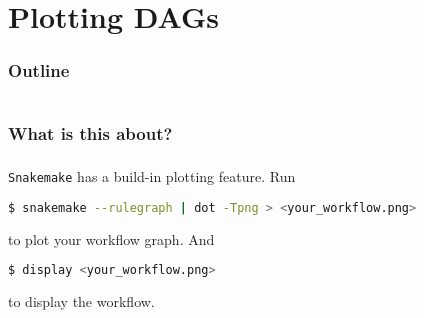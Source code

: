 \section{Plotting DAGs}

\begin{frame}
    \frametitle{Outline}
    \begin{columns}[t]
        \begin{column}{.5\textwidth}
            \tableofcontents[sections={1-9},currentsection]
        \end{column}
        \begin{column}{.5\textwidth}
            \tableofcontents[sections={10-18},currentsection]
        \end{column}
    \end{columns}
\end{frame}

\begin{frame}
  \frametitle{What is this about?}
\end{frame}


\begin{frame}[fragile]
  \frametitle{}
  \texttt{Snakemake} has a build-in plotting feature. Run 
  \begin{lstlisting}[language=Bash, style=Shell]
$ snakemake --rulegraph | dot -Tpng > <your_workflow.png>
  \end{lstlisting}
  to plot your workflow graph. And
  \begin{lstlisting}[language=Bash, style=Shell]
$ display <your_workflow.png>
  \end{lstlisting}
  to display the workflow.
\end{frame}

